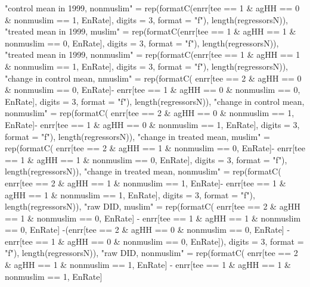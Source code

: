 \begin{Schunk}
\begin{Sinput}
{{{{{{{{                     "control mean in 1999, nonmuslim" = 
                       rep(formatC(enrr[tee == 1 & agHH == 0 & nonmuslim == 1, EnRate], 
                         digits = 3, format = "f"), length(regressorsN)),
                     "treated mean in 1999, muslim" =
                       rep(formatC(enrr[tee == 1 & agHH == 1 & nonmuslim == 0, EnRate], 
                         digits = 3, format = "f"), length(regressorsN)),
                     "treated mean in 1999, nonmuslim" =
                       rep(formatC(enrr[tee == 1 & agHH == 1 & nonmuslim == 1, EnRate], 
                         digits = 3, format = "f"), length(regressorsN)),
                     "change in control mean, nmuslim" = 
                       rep(formatC(
                         enrr[tee == 2 & agHH == 0 & nonmuslim == 0, EnRate]-
                         enrr[tee == 1 & agHH == 0 & nonmuslim == 0, EnRate], 
                         digits = 3, format = "f"), length(regressorsN)),
                     "change in control mean, nonmuslim" = 
                       rep(formatC(
                         enrr[tee == 2 & agHH == 0 & nonmuslim == 1, EnRate]-
                         enrr[tee == 1 & agHH == 0 & nonmuslim == 1, EnRate], 
                         digits = 3, format = "f"), length(regressorsN)),
                     "change in treated mean, muslim" = 
                       rep(formatC(
                         enrr[tee == 2 & agHH == 1 & nonmuslim == 0, EnRate]-
                         enrr[tee == 1 & agHH == 1 & nonmuslim == 0, EnRate], 
                         digits = 3, format = "f"), length(regressorsN)),
                     "change in treated mean, nonmuslim" = 
                       rep(formatC(
                         enrr[tee == 2 & agHH == 1 & nonmuslim == 1, EnRate]-
                         enrr[tee == 1 & agHH == 1 & nonmuslim == 1, EnRate], 
                         digits = 3, format = "f"), length(regressorsN)),
                     "raw DID, muslim" =
                       rep(formatC(
                       enrr[tee == 2 & agHH == 1 & nonmuslim == 0, EnRate] - 
                       enrr[tee == 1 & agHH == 1 & nonmuslim == 0, EnRate] 
                       -(enrr[tee == 2 & agHH == 0 & nonmuslim == 0, EnRate] - 
                         enrr[tee == 1 & agHH == 0 & nonmuslim == 0, EnRate]), 
                         digits = 3, format = "f"), length(regressorsN)),
                     "raw DID, nonmuslim" =
                       rep(formatC(
                       enrr[tee == 2 & agHH == 1 & nonmuslim == 1, EnRate] - 
                       enrr[tee == 1 & agHH == 1 & nonmuslim == 1, EnRate] 
}}}}}}}}
\end{Sinput}
\end{Schunk}
